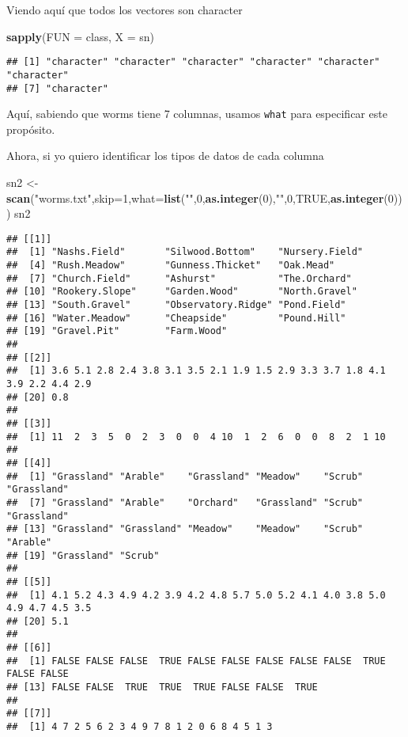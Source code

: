 \documentclass[]{article}
\newenvironment{Shaded}{\begin{snugshade}}{\end{snugshade}}
\newcommand{\KeywordTok}[1]{\textcolor[rgb]{0.13,0.29,0.53}{\textbf{#1}}}
\newcommand{\DataTypeTok}[1]{\textcolor[rgb]{0.13,0.29,0.53}{#1}}
\newcommand{\DecValTok}[1]{\textcolor[rgb]{0.00,0.00,0.81}{#1}}
\newcommand{\StringTok}[1]{\textcolor[rgb]{0.31,0.60,0.02}{#1}}
\newcommand{\OtherTok}[1]{\textcolor[rgb]{0.56,0.35,0.01}{#1}}
\newcommand{\NormalTok}[1]{#1}
\begin{document}
Viendo aquí que todos los vectores son character

\begin{Shaded}
\begin{Highlighting}[]
\KeywordTok{sapply}\NormalTok{(}\DataTypeTok{FUN =}\NormalTok{ class, }\DataTypeTok{X =}\NormalTok{ sn)}
\end{Highlighting}
\end{Shaded}

\begin{verbatim}
## [1] "character" "character" "character" "character" "character" "character"
## [7] "character"
\end{verbatim}

Aquí, sabiendo que worms tiene 7 columnas, usamos \texttt{what} para
especificar este propósito.

Ahora, si yo quiero identificar los tipos de datos de cada columna

\begin{Shaded}
\begin{Highlighting}[]
\NormalTok{sn2 <-}\StringTok{ }\KeywordTok{scan}\NormalTok{(}\StringTok{"worms.txt"}\NormalTok{,}\DataTypeTok{skip=}\DecValTok{1}\NormalTok{,}\DataTypeTok{what=}\KeywordTok{list}\NormalTok{(}\StringTok{""}\NormalTok{,}\DecValTok{0}\NormalTok{,}\KeywordTok{as.integer}\NormalTok{(}\DecValTok{0}\NormalTok{),}\StringTok{""}\NormalTok{,}\DecValTok{0}\NormalTok{,}\OtherTok{TRUE}\NormalTok{,}\KeywordTok{as.integer}\NormalTok{(}\DecValTok{0}\NormalTok{)))}
\NormalTok{sn2}
\end{Highlighting}
\end{Shaded}

\begin{verbatim}
## [[1]]
##  [1] "Nashs.Field"       "Silwood.Bottom"    "Nursery.Field"    
##  [4] "Rush.Meadow"       "Gunness.Thicket"   "Oak.Mead"         
##  [7] "Church.Field"      "Ashurst"           "The.Orchard"      
## [10] "Rookery.Slope"     "Garden.Wood"       "North.Gravel"     
## [13] "South.Gravel"      "Observatory.Ridge" "Pond.Field"       
## [16] "Water.Meadow"      "Cheapside"         "Pound.Hill"       
## [19] "Gravel.Pit"        "Farm.Wood"        
## 
## [[2]]
##  [1] 3.6 5.1 2.8 2.4 3.8 3.1 3.5 2.1 1.9 1.5 2.9 3.3 3.7 1.8 4.1 3.9 2.2 4.4 2.9
## [20] 0.8
## 
## [[3]]
##  [1] 11  2  3  5  0  2  3  0  0  4 10  1  2  6  0  0  8  2  1 10
## 
## [[4]]
##  [1] "Grassland" "Arable"    "Grassland" "Meadow"    "Scrub"     "Grassland"
##  [7] "Grassland" "Arable"    "Orchard"   "Grassland" "Scrub"     "Grassland"
## [13] "Grassland" "Grassland" "Meadow"    "Meadow"    "Scrub"     "Arable"   
## [19] "Grassland" "Scrub"    
## 
## [[5]]
##  [1] 4.1 5.2 4.3 4.9 4.2 3.9 4.2 4.8 5.7 5.0 5.2 4.1 4.0 3.8 5.0 4.9 4.7 4.5 3.5
## [20] 5.1
## 
## [[6]]
##  [1] FALSE FALSE FALSE  TRUE FALSE FALSE FALSE FALSE FALSE  TRUE FALSE FALSE
## [13] FALSE FALSE  TRUE  TRUE  TRUE FALSE FALSE  TRUE
## 
## [[7]]
##  [1] 4 7 2 5 6 2 3 4 9 7 8 1 2 0 6 8 4 5 1 3
\end{verbatim}
\end{document}

